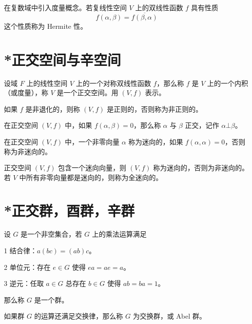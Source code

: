 在复数域中引入度量概念。若复线性空间 $V$ 上的双线性函数 $f$ 具有性质
\[ f(\alpha,\beta) = \overline{f(\beta,\alpha)} \]
这个性质称为 Hermite 性。

\section{*正交空间与辛空间}

\begin{definition}
    设域 $F$ 上的线性空间 $V$ 上的一个对称双线性函数 $f$，那么称 $f$ 是 $V$ 上的一个内积（或度量），称 $V$ 是一个正交空间。用 $(V,f)$ 表示。
\end{definition}

如果 $f$ 是非退化的，则称 $(V,f)$ 是正则的，否则称为非正则的。

\begin{definition}
    在正交空间 $(V,f)$ 中，如果 $f(\alpha,\beta) = 0$，那么称 $\alpha$ 与 $\beta$ 正交，记作 $\alpha \bot \beta$。
\end{definition}

在正交空间 $(V,f)$ 中，一个非零向量 $\alpha$ 称为迷向的，如果 $f(\alpha,\alpha) = 0$，否则称为非迷向的。

正交空间 $(V,f)$ 包含一个迷向向量，则 $(V,f)$ 称为迷向的，否则为非迷向的。若 $V$ 中所有非零向量都是迷向的，则称为全迷向的。

\section{*正交群，酉群，辛群}

\begin{definition}
    设 $G$ 是一个非空集合，若 $G$ 上的乘法运算满足

    \num{1} 结合律：$a(bc) = (ab)c$。

    \num{2} 单位元：存在 $e \in G$ 使得 $ea = ae = a$。

    \num{3} 逆元：任取 $a \in G$ 总存在 $b \in G$ 使得 $ab = ba = 1$。

    那么称 $G$ 是一个群。
\end{definition}

如果群 $G$ 的运算还满足交换律，那么称 $G$ 为交换群，或 Abel 群。











